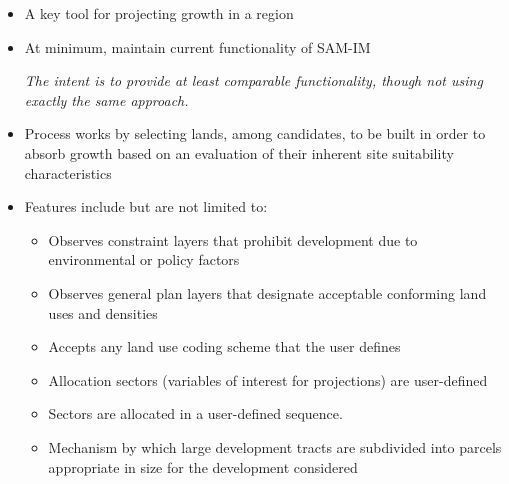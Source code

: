 \begin{itemize}
\item A key tool for projecting growth in a region
\item At minimum, maintain current functionality of SAM-IM

\emph{The intent is to provide at least comparable functionality, though not using exactly the same approach.}

\item Process works by selecting lands, among candidates, to be built in order to absorb growth based on an evaluation of their inherent site suitability characteristics
\item Features include but are not limited to:
\begin{itemize}
\item Observes constraint layers that prohibit development due to environmental or policy factors
\item Observes general plan layers that designate acceptable conforming land uses and densities
\item Accepts any land use coding scheme that the user defines
\item Allocation sectors (variables of interest for projections) are user-defined
\item Sectors are allocated in a user-defined sequence.
\item Mechanism by which large development tracts are subdivided into parcels appropriate in size for the development considered


\end{itemize}
\end{itemize}
